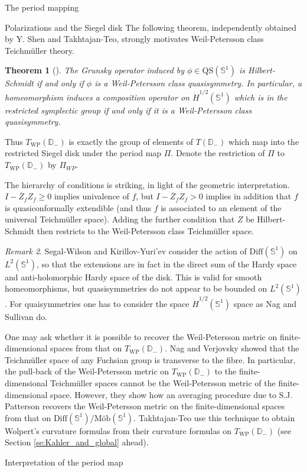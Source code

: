 \documentclass[12pt]{amsart}
\newcommand{\disk}{\ensuremath{\mathbb{D}} } %
\theoremstyle{plain}
\newtheorem{theorem}{Theorem}[section]
\theoremstyle{definition}
\theoremstyle{remark}
\newtheorem{remark}[theorem]{Remark}
\numberwithin{equation}{section} %
\numberwithin{figure}{section} %
\begin{document}
\begin{section}{The period mapping}
\begin{subsection}{Polarizations and the Siegel disk}
The following theorem, independently obtained by Y. Shen and Takhtajan-Teo, strongly motivates Weil-Petersson class Teichm\"uller theory. 
   \begin{theorem}[\cite{ShenGrunsky,Takhtajan_Teo_Memoirs}] \label{th:symp_res_is_WP}
    The Grunsky operator induced by $\phi \in \mathrm{QS}(\mathbb{S}^1)$ is Hilbert-Schmidt if and only if $\phi$ is a Weil-Petersson class quasisymmetry. In particular, a homeomorphism induces a composition operator on $\dot{H}^{1/2}(\mathbb{S}^1)$ which is in the restricted symplectic group if and only if it is a Weil-Petersson class quasisymmetry.
   \end{theorem} 
   Thus $T_{\mathrm{WP}}(\mathbb{D}_-)$ is exactly the group of elements of $T(\disk_-)$ which map into the restricted Siegel disk under the period map $\Pi$. Denote the restriction of $\Pi$ to $T_{\mathrm{WP}}(\mathbb{D}_-)$ by $\Pi_{WP}$.  

   The hierarchy of conditions is striking, in light of the geometric interpretation. $I- \overline{Z}_f Z_f \geq 0$ implies univalence of $f$, but $I- \overline{Z}_f Z_f>0$ implies in addition that $f$ is  quasiconformally extendible (and thus $f$ is associated to an element of the universal Teichm\"uller space). Adding the further condition that $Z$ be Hilbert-Schmidt then restricts to the Weil-Petersson class Teichm\"uller space.  
   
   \begin{remark}
   Segal-Wilson and Kirillov-Yuri'ev consider the action of $\mathrm{Diff}(\mathbb{S}^1)$ on $L^2(\mathbb{S}^1)$, so that the extensions are in fact in the direct sum of the Hardy space and anti-holomorphic Hardy space of the disk. This is valid for smooth homeomorphisms, but quasisymmetries do not appear to be bounded on $L^2(\mathbb{S}^1)$. For quaisymmetries one has to consider the space $\dot{H}^{1/2}(\mathbb{S}^1)$ space as Nag and Sullivan do.  
   \end{remark} 

  
One may ask whether it is possible to recover the Weil-Petersson metric on finite-dimensional spaces from that on $T_{\mathrm{WP}}(\disk_-)$. 
Nag and Verjovsky \cite{NagVerjovsky} showed that the Teichm\"uller space of any Fuchsian group is transverse to the fibre. In particular, the pull-back of the Weil-Petersson metric on $T_{\mathrm{WP}}(\disk_-)$ to the finite-dimensional Teichm\"uller spaces cannot be the Weil-Petersson metric of the finite-dimensional space. However, they show how an averaging procedure due to S.J. Patterson recovers the Weil-Petersson metric on the finite-dimensional spaces from that on $\text{Diff}(\mathbb{S}^1)/\text{M\"ob}(\mathbb{S}^1)$. Takhtajan-Teo use this technique to obtain Wolpert's curvature formulas from their curvature formulas on $T_{\mathrm{WP}}(\disk_-)$ \cite{Takhtajan_Teo_Memoirs} (see Section \ref{se:Kahler_and_global} ahead).
 \end{subsection}
 \begin{subsection}{Interpretation of the period map} 
 

\end{subsection}
\end{section}
\end{document}
